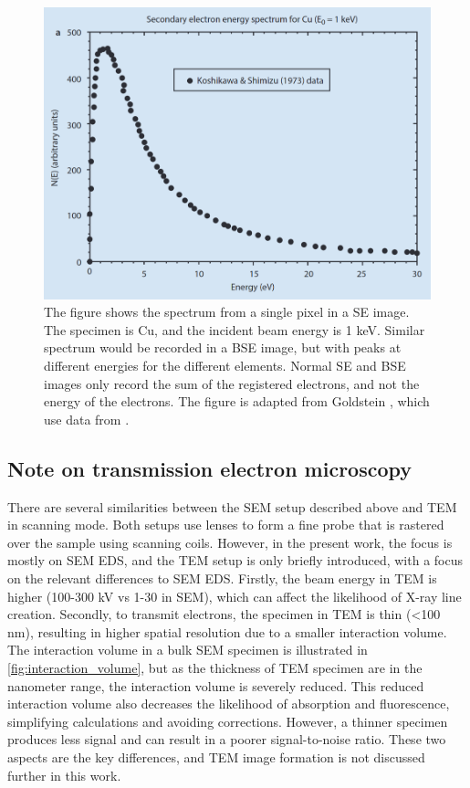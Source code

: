 \begin{figure}[ht]
    \centering
    \includegraphics[width=0.8\linewidth]{figures/SEM_SE_spectrums.png}
    \caption{
        The figure shows the spectrum from a single pixel in a SE image.
        The specimen is Cu, and the incident beam energy is 1 keV.
        Similar spectrum would be recorded in a BSE image, but with peaks at different energies for the different elements.
        Normal SE and BSE images only record the sum of the registered electrons, and not the energy of the electrons.
        The figure is adapted from Goldstein \cite[Fig. 3.1 a]{goldstein_scanning_2018}, which use data from \cite{koshikawa_SE_spectrum_1973}.
    }
    \label{fig:SEM_SE_spectrums}
\end{figure}


\subsection{Note on transmission electron microscopy}
\label{theory:sem:tem}

There are several similarities between the SEM setup described above and TEM in scanning mode.
Both setups use lenses to form a fine probe that is rastered over the sample using scanning coils.
However, in the present work, the focus is mostly on SEM EDS, and the TEM setup is only briefly introduced, with a focus on the relevant differences to SEM EDS.
Firstly, the beam energy in TEM is higher (100-300 kV vs 1-30 in SEM), which can affect the likelihood of X-ray line creation.
Secondly, to transmit electrons, the specimen in TEM is thin (<100 nm), resulting in higher spatial resolution due to a smaller interaction volume.
The interaction volume in a bulk SEM specimen is illustrated in \cref{fig:interaction_volume}, but as the thickness of TEM specimen are in the nanometer range, the interaction volume is severely reduced.
This reduced interaction volume also decreases the likelihood of absorption and fluorescence, simplifying calculations and avoiding corrections.
However, a thinner specimen produces less signal and can result in a poorer signal-to-noise ratio.
These two aspects are the key differences, and TEM image formation is not discussed further in this work.



